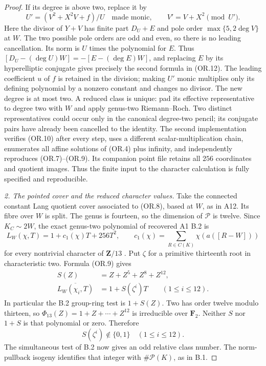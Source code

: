\begin{proof}
If its degree is above two, replace it by
\[
     U'=(V^2+X^2V+f)/U\quad\text{made monic},\qquad
     V'=V+X^2\pmod{U'}.
 \tag{OR.12}
\]
Here the divisor of $Y+V$ has finite part $D_U+E$ and pole
order $\max\{5,2\deg V\}$ at $W$.  The two possible pole
orders are odd and even, so there is no leading cancellation.
Its norm is $U$ times the polynomial for $E$.  Thus
$[D_U-(\deg U)W]=-[E-(\deg E)W]$, and replacing $E$ by its
hyperelliptic conjugate gives precisely the second formula in
(OR.12).  The leading coefficient $u$ of $f$ is retained in
the division; making $U'$ monic multiplies only its defining
polynomial by a nonzero constant and changes no divisor.
The new degree is at most two.  A reduced class is unique:
pad its effective representative to degree two with $W$ and
apply genus-two Riemann--Roch.  Two distinct representatives
could occur only in the canonical degree-two pencil; its
conjugate pairs have already been cancelled to the identity.
The second implementation verifies (OR.10) after every step,
uses a different scalar-multiplication chain, enumerates all
affine solutions of (OR.4) plus infinity, and independently
reproduces (OR.7)--(OR.9).  Its companion point file retains all
$256$ coordinates and quotient images.  Thus the finite input
to the character calculation is fully specified and reproducible.

\emph{2. The pointed cover and the reduced character values.}
Take the connected constant Lang quotient cover associated to
(OR.8), based at $W$, as in A12.  Its fibre over $W$ is split.
The genus is fourteen, so the dimension of $\mathcal P$ is twelve.
Since $K_C\sim2W$, the exact genus-two polynomial of recovered
A1 B.2 is
\[
 L_W(\chi,T)=1+c_1(\chi)T+256T^2,
 \qquad
 c_1(\chi)=\sum_{R\in C(K)}\chi(a([R-W]))
 \tag{OR.13}
\]
for every nontrivial character of $\mathbf Z/13$
\cite[B.2]{A1run}.  Put $\zeta$ for a primitive thirteenth root
in characteristic two.  Formula (OR.9) gives
\[
 \begin{aligned}
 S(Z)&=Z+Z^5+Z^8+Z^{12},\\
 \overline{L_W(\chi_i,T)}&=1+S(\zeta^i)T
                         \qquad(1\le i\le12).
 \end{aligned}
 \tag{OR.14}
\]
In particular the B.2 group-ring test is $1+S(Z)$.
Two has order twelve modulo thirteen, so
$\Phi_{13}(Z)=1+Z+\cdots+Z^{12}$ is irreducible over
$\mathbf F_2$.  Neither $S$ nor $1+S$ is that polynomial or
zero.  Therefore
\[
                        S(\zeta^i)\notin\{0,1\}
                           \quad(1\le i\le12).
 \tag{OR.15}
\]
The simultaneous test of B.2 now gives an odd relative class
number.  The norm-pullback isogeny identifies that integer with
$\#\mathcal P(K)$, as in B.1.


\end{proof}
